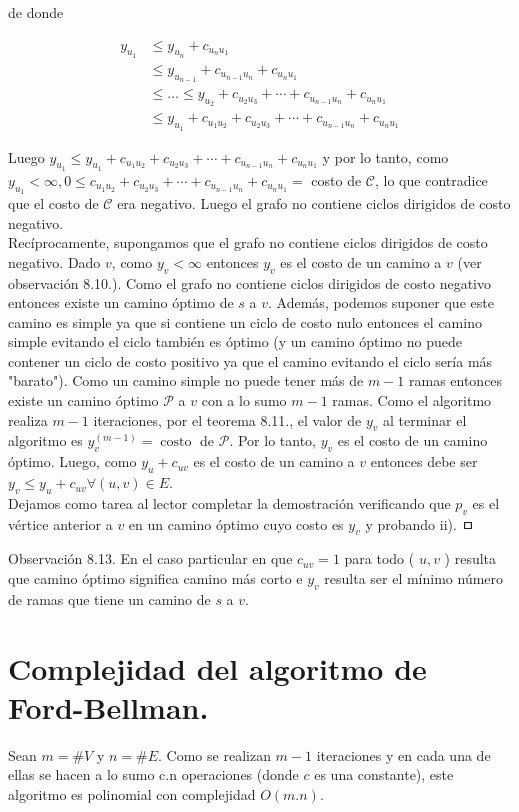 \documentclass[10pt]{article}
\begin{document}
de donde

$$
\begin{aligned}
y_{u_{1}} & \leq y_{u_{n}}+c_{u_{n} u_{1}} \\
& \leq y_{u_{n-1}}+c_{u_{n-1} u_{n}}+c_{u_{n} u_{1}} \\
& \leq \ldots \leq y_{u_{2}}+c_{u_{2} u_{3}}+\cdots+c_{u_{n-1} u_{n}}+c_{u_{n} u_{1}} \\
& \leq y_{u_{1}}+c_{u_{1} u_{2}}+c_{u_{2} u_{3}}+\cdots+c_{u_{n-1} u_{n}}+c_{u_{n} u_{1}}
\end{aligned}
$$

Luego $y_{u_{1}} \leq y_{u_{1}}+c_{u_{1} u_{2}}+c_{u_{2} u_{3}}+\cdots+c_{u_{n-1} u_{n}}+c_{u_{n} u_{1}}$ y por lo tanto, como $y_{u_{1}}<\infty, 0 \leq c_{u_{1} u_{2}}+c_{u_{2} u_{3}}+ \cdots+c_{u_{n-1} u_{n}}+c_{u_{n} u_{1}}=$ costo de $\mathcal{C}$, lo que contradice que el costo de $\mathcal{C}$ era negativo. Luego el grafo no contiene ciclos dirigidos de costo negativo.\\
Recíprocamente, supongamos que el grafo no contiene ciclos dirigidos de costo negativo. Dado $v$, como $y_{v}<\infty$ entonces $y_{v}$ es el costo de un camino a $v$ (ver observación 8.10.). Como el grafo no contiene ciclos dirigidos de costo negativo entonces existe un camino óptimo de $s$ a $v$. Además, podemos suponer que este camino es simple ya que si contiene un ciclo de costo nulo entonces el camino simple evitando el ciclo también es óptimo (y un camino óptimo no puede contener un ciclo de costo positivo ya que el camino evitando el ciclo sería más "barato"). Como un camino simple no puede tener más de $m-1$ ramas entonces existe un camino óptimo $\mathcal{P}$ a $v$ con a lo sumo $m-1$ ramas. Como el algoritmo realiza $m-1$ iteraciones, por el teorema 8.11., el valor de $y_{v}$ al terminar el algoritmo es $y_{v}^{(m-1)}=\operatorname{costo}$ de $\mathcal{P}$. Por lo tanto, $y_{v}$ es el costo de un camino óptimo. Luego, como $y_{u}+c_{u v}$ es el costo de un camino a $v$ entonces debe ser $y_{v} \leq y_{u}+c_{u v} \forall(u, v) \in E$.\\
Dejamos como tarea al lector completar la demostración verificando que $p_{v}$ es el vértice anterior a $v$ en un camino óptimo cuyo costo es $y_{v}$ y probando ii). ㅁ

Observación 8.13. En el caso particular en que $c_{u v}=1$ para todo ( $u, v$ ) resulta que camino óptimo significa camino más corto e $y_{v}$ resulta ser el mínimo número de ramas que tiene un camino de $s$ a $v$.

\section*{Complejidad del algoritmo de Ford-Bellman.}
Sean $m=\# V$ y $n=\# E$. Como se realizan $m-1$ iteraciones y en cada una de ellas se hacen a lo sumo c.n operaciones (donde $c$ es una constante), este algoritmo es polinomial con complejidad $O(m . n)$.
\end{document}
